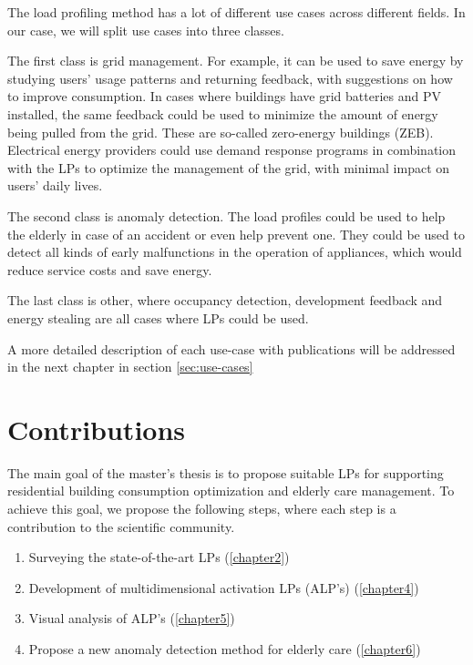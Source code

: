 The load profiling method has a lot of different use cases across different fields.
In our case, we will split use cases into three classes.

The first class is grid management.
For example, it can be used to save energy by studying users' usage patterns and returning feedback, with suggestions on how to improve consumption.
In cases where buildings have grid batteries and PV installed, the same feedback could be used to minimize the amount of energy being pulled from the grid.
These are so-called zero-energy buildings (ZEB).
Electrical energy providers could use demand response programs in combination with the LPs to optimize the management of the grid, with minimal impact on users' daily lives.

The second class is anomaly detection.
The load profiles could be used to help the elderly in case of an accident or even help prevent one. 
They could be used to detect all kinds of early malfunctions in the operation of appliances, which would reduce service costs and save energy.

The last class is other, where occupancy detection, development feedback and energy stealing are all cases where LPs could be used. 

A more detailed description of each use-case with publications will be addressed in the next chapter in section \ref{sec:use-cases}


\section{Contributions}
\label{sec:contributions} %

The main goal of the master's thesis is to propose suitable LPs for supporting residential building consumption optimization and elderly care management.
To achieve this goal, we propose the following steps, where each step is a contribution to the scientific community.

\begin{enumerate}
	\item Surveying the state-of-the-art LPs (\ref{chapter2})
	\item Development of multidimensional activation LPs (ALP's) (\ref{chapter4})
	\item Visual analysis of ALP's (\ref{chapter5})
	\item Propose a new anomaly detection method for elderly care (\ref{chapter6})
\end{enumerate}


